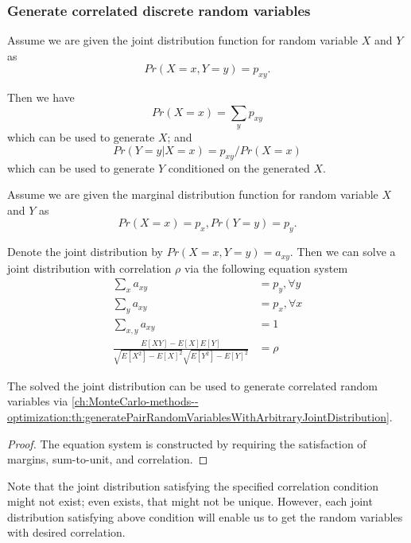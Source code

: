 \begin{refsection}
\subsubsection{Generate correlated discrete random variables}

\begin{lemma}\label{ch:MonteCarlo-methods--optimization:th:generatePairRandomVariablesWithArbitraryJointDistribution}
	Assume we are given the joint distribution function for random variable $X$ and $Y$ as
	$$Pr(X=x, Y=y) = p_{xy}.$$
	
	Then we have
	$$Pr(X = x) = \sum_y p_{xy}$$
	which can be used to generate $X$; and
	$$Pr(Y=y|X=x)= p_{xy}/Pr(X=x)$$	
	which can be used to generate $Y$ conditioned on the generated $X$.
\end{lemma}


\begin{lemma}
Assume we are given the marginal distribution function for random variable $X$ and $Y$ as
$$Pr(X=x) = p_x, Pr(Y=y) = p_y.$$

Denote the joint distribution by $Pr(X=x,Y=y) = a_{xy}$.
Then we can solve a joint distribution with correlation $\rho$ via the following equation system
\begin{align*}
\sum_x a_{xy} &= p_y, \forall y \\
\sum_y a_{xy} &= p_x, \forall x \\
\sum_{x,y} a_{xy} &= 1\\
\frac{E[XY]-E[X]E[Y]}{\sqrt{E[X^2]-E[X]^2}\sqrt{E[Y^2]-E[Y]^2}} &=\rho 
\end{align*}

The solved the joint distribution can be used to generate correlated random variables via \autoref{ch:MonteCarlo-methods--optimization:th:generatePairRandomVariablesWithArbitraryJointDistribution}.	
\end{lemma}
\begin{proof}
The equation system is constructed by requiring the satisfaction of margins, sum-to-unit, and correlation.
\end{proof}

\begin{remark}
Note that the joint distribution satisfying the specified correlation condition might not exist; even exists, that might not be unique. However, each joint distribution satisfying above condition will enable us to get the random variables with desired correlation.
\end{remark}



\end{refsection}
